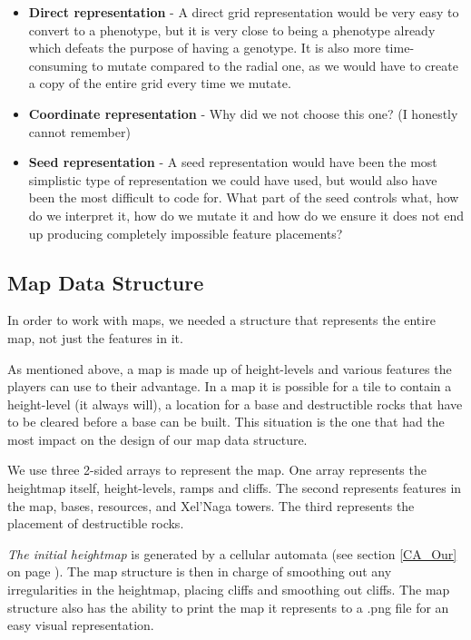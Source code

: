 \begin{itemize}

	\item \textbf{Direct representation} - A direct grid representation would be very easy to convert to a phenotype, but it is very close to being a phenotype already which defeats the purpose of having a genotype. It is also more time-consuming to mutate compared to the radial one, as we would have to create a copy of the entire grid every time we mutate.

	\item \textbf{Coordinate representation} - Why did we not choose this one? (I honestly cannot remember)

	\item \textbf{Seed representation} - A seed representation would have been the most simplistic type of representation we could have used, but would also have been the most difficult to code for. What part of the seed controls what, how do we interpret it, how do we mutate it and how do we ensure it does not end up producing completely impossible feature placements?

\end{itemize}

\subsection{Map Data Structure}
\label{MapRepresentation_MapStructure}

In order to work with maps, we needed a structure that represents the entire map, not just the features in it.

As mentioned above, a map is made up of height-levels and various features the players can use to their advantage. In a map it is possible for a tile to contain a height-level (it always will), a location for a base and destructible rocks that have to be cleared before a base can be built. This situation is the one that had the most impact on the design of our map data structure.

We use three 2-sided arrays to represent the map. One array represents the heightmap itself, height-levels, ramps and cliffs. The second represents features in the map, bases, resources, and Xel'Naga towers. The third represents the placement of destructible rocks.

\textit{The initial heightmap} is generated by a cellular automata (see section \ref{CA_Our} on page \pageref{CA_Our}). The map structure is then in charge of smoothing out any irregularities in the heightmap, placing cliffs and smoothing out cliffs. The map structure also has the ability to print the map it represents to a .png file for an easy visual representation.

